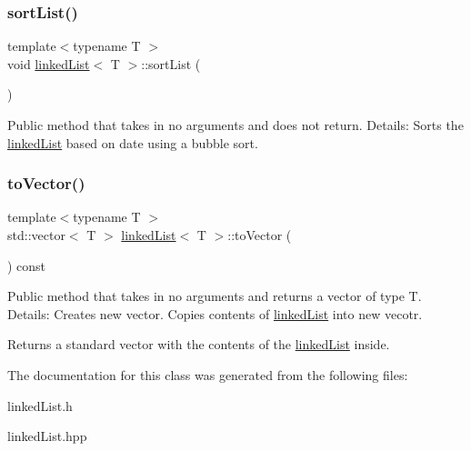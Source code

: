 \subsubsection{\texorpdfstring{sort\+List()}{sortList()}}
{\footnotesize\ttfamily template$<$typename T $>$ \\
void \hyperlink{classlinked_list}{linked\+List}$<$ T $>$\+::sort\+List (\begin{DoxyParamCaption}{ }\end{DoxyParamCaption})}

Public method that takes in no arguments and does not return. Details\+: Sorts the \hyperlink{classlinked_list}{linked\+List} based on date using a bubble sort. \mbox{\label{classlinked_list_ac520d6ebd99194ed4589245bfb332903}} 
\subsubsection{\texorpdfstring{to\+Vector()}{toVector()}}
{\footnotesize\ttfamily template$<$typename T $>$ \\
std\+::vector$<$ T $>$ \hyperlink{classlinked_list}{linked\+List}$<$ T $>$\+::to\+Vector (\begin{DoxyParamCaption}{ }\end{DoxyParamCaption}) const}

Public method that takes in no arguments and returns a vector of type T. Details\+: Creates new vector. Copies contents of \hyperlink{classlinked_list}{linked\+List} into new vecotr. \begin{DoxyReturn}{Returns}
a standard vector with the contents of the \hyperlink{classlinked_list}{linked\+List} inside. 
\end{DoxyReturn}


The documentation for this class was generated from the following files\+:\begin{DoxyCompactItemize}
\item 
linked\+List.\+h\item 
linked\+List.\+hpp\end{DoxyCompactItemize}
